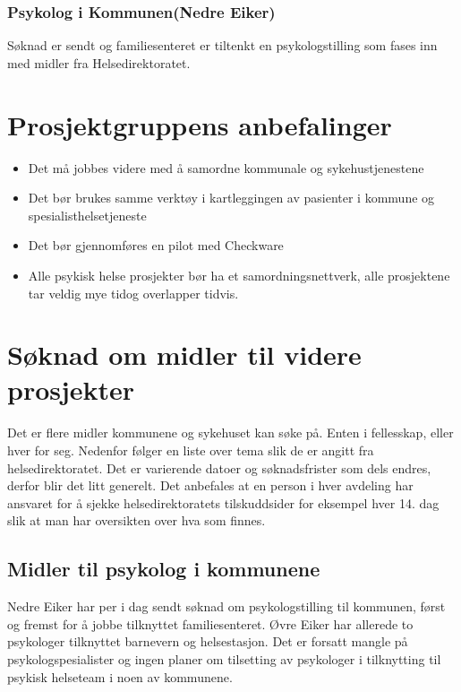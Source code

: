\documentclass[11pt]{report} %
\begin{document}
                  \subsubsection{Psykolog i Kommunen(Nedre Eiker)}
                    Søknad er sendt og familiesenteret er tiltenkt en psykologstilling som fases inn med midler fra Helsedirektoratet.
                \section{Prosjektgruppens anbefalinger}\label{chap:vvidere_anbef}
                  \begin{itemize}
                    \item Det må jobbes videre med å samordne kommunale og sykehustjenestene\\
                    \item Det bør brukes samme verktøy i kartleggingen av pasienter i kommune og spesialisthelsetjeneste\\
                    \item Det bør gjennomføres en pilot med Checkware\\
                    \item Alle psykisk helse prosjekter bør ha et samordningsnettverk, alle prosjektene tar veldig mye tidog overlapper tidvis.\\
                  \end{itemize}
                \section{Søknad om midler til videre prosjekter}\label{chap:vvidere_soknmid}
                  Det er flere midler kommunene og sykehuset kan søke på. Enten i fellesskap, eller hver for seg. Nedenfor følger en liste over tema slik de er angitt fra helsedirektoratet. Det er varierende datoer og søknadsfrister som dels endres, derfor blir det litt generelt. Det anbefales at en person i hver avdeling har ansvaret for å sjekke helsedirektoratets tilskuddsider for eksempel hver 14. dag slik at man har oversikten over hva som finnes.\\
                  \subsection{Midler til psykolog i kommunene}\label{sec:vv_mid_psyk}
                    Nedre Eiker har per i dag sendt søknad om psykologstilling til kommunen, først og fremst for å jobbe tilknyttet familiesenteret. Øvre Eiker har allerede to psykologer tilknyttet barnevern og helsestasjon. Det er forsatt mangle på psykologspesialister og ingen planer om tilsetting av psykologer i tilknytting til psykisk helseteam i noen av kommunene.
\end{document}
